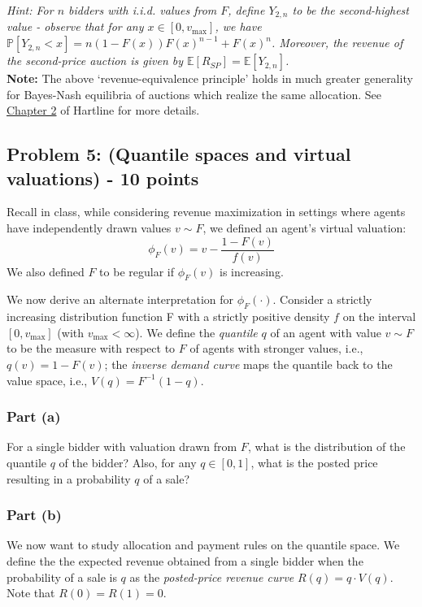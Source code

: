 \documentclass[letterpaper,11pt]{article}
\begin{document}
\noindent\emph{Hint: For $n$ bidders with i.i.d. values from $F$, define $Y_{2,n}$ to be the second-highest value - observe that for any $x\in[0,v_{\max}]$, we have $\mathbb{P}[Y_{2,n}< x]=n(1-F(x))F(x)^{n-1}+F(x)^n$. Moreover, the revenue of the second-price auction is given by $\mathbb{E}[R_{SP}]=\mathbb{E}[Y_{2,n}]$.}\\


\noindent\textbf{Note:} The above `revenue-equivalence principle' holds in much greater generality for Bayes-Nash equilibria of auctions which realize the same allocation. See \href{http://jasonhartline.com/MDnA/MDnA-ch2.pdf}{Chapter 2} of Hartline for more details.


\subsection*{Problem 5: (Quantile spaces and virtual valuations) - 10 points}

Recall in class, while considering revenue maximization in settings where agents have independently drawn values $v\sim F$, we defined an agent's virtual valuation:
$$\phi_F(v) = v -\frac{1-F(v)}{f(v)}$$
We also defined $F$ to be regular if $\phi_F(v)$ is increasing. 

We now derive an alternate interpretation for $\phi_F(\cdot)$. Consider a strictly increasing distribution function F with a strictly positive density $f$ on the interval $[0, v_{\max}]$ (with $v_{\max}<\infty$). We define the \emph{quantile} $q$ of an agent with value $v\sim F$ to be the measure with respect to $F$ of agents with stronger values, i.e., $q(v) =1- F(v)$; the \emph{inverse demand curve} maps the quantile back to the value space, i.e., $V(q) = F^{-1}(1-q)$. 

\subsubsection*{Part (a)} 
For a single bidder with valuation drawn from $F$, what is the distribution of the quantile $q$ of the bidder? Also, for any $q \in [0, 1]$, what is the posted price resulting in a probability $q$ of a sale? 

\subsubsection*{Part (b)} 
We now want to study allocation and payment rules on the quantile space. We define the the expected revenue obtained from a single bidder when the probability of a sale is $q$ as the \emph{posted-price revenue curve} $R(q) = q \cdot V (q)$. Note that $R(0) = R(1) = 0$. 
\end{document}
